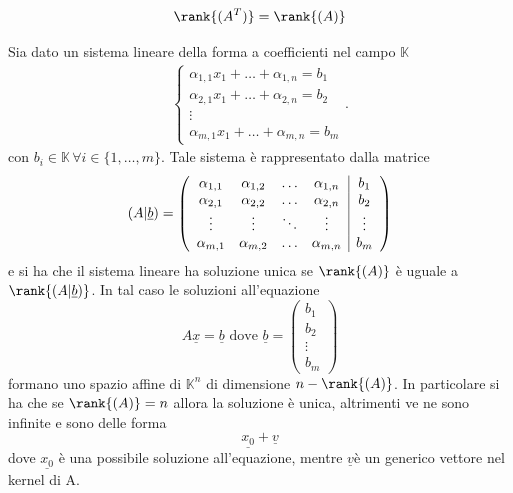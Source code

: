 \begin{cor}
  $$
    \rank{(A^T)} = \rank{(A)}
  $$
\end{cor}

\begin{theorem} \label{thm:rouche_capelli}
  Sia dato un sistema lineare della forma a coefficienti nel campo $\mathbb{K}$
  \begin{align}
    \begin{cases}
      \alpha_{1, 1} x_1 + \ldots + \alpha_{1, n} = b_1 \\
      \alpha_{2, 1} x_1 + \ldots + \alpha_{2, n} = b_2 \\
      \vdots \\
      \alpha_{m, 1} x_1 + \ldots + \alpha_{m, n} = b_m
    \end{cases}.
  \end{align}
  con $b_i \in \mathbb{K} \, \forall i \in \{ 1, \ldots, m \}$. Tale sistema è rappresentato dalla matrice
  $$
    (A | \underline{b}) = \left( \begin{array}{c c c c | c}
      \alpha_{1, 1} & \alpha_{1, 2} & \ldots & \alpha_{1, n}  & b_1 \\
      \alpha_{2, 1} & \alpha_{2, 2} & \ldots & \alpha_{2, n} & b_2 \\
      \vdots & \vdots & \ddots & \vdots & \vdots \\
      \alpha_{m, 1} & \alpha_{m, 2} & \ldots & \alpha_{m,n} & b_m
    \end{array} \right)
  $$
  e si ha che il sistema lineare ha soluzione unica se $\rank{(A)}$ è uguale a $\rank{(A | \underline{b})}$. In tal caso le soluzioni all'equazione
  $$
    A \underline{x} = \underline{b} \text{ dove } \underline{b} = \begin{pmatrix} b_1 \\ b_2 \\ \vdots \\ b_m \end{pmatrix}
  $$
  formano uno spazio affine di $\mathbb{K}^n$ di dimensione $n - \rank{(A)}$. In particolare si ha che se $\rank{(A)} = n$ allora la soluzione è unica, altrimenti ve ne sono infinite e sono delle forma
  $$
    \underline{x_0} + \underline{v}
  $$
  dove $\underline{x_0}$ è una possibile soluzione all'equazione, mentre $\underline{v}$è un generico vettore nel kernel di A.
\end{theorem}

